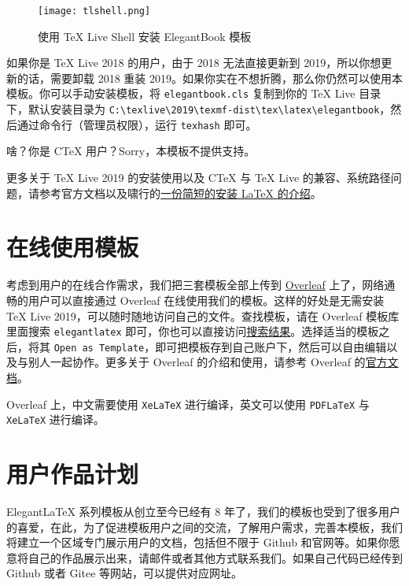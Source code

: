 	\begin{figure}[htbp]
	\centering
	\texttt{[image: tlshell.png]}
	\caption{使用 \TeX{} Live Shell 安装 ElegantBook 模板}
	\end{figure}
	
	如果你是 \TeX{} Live 2018 的用户，由于 2018 无法直接更新到 2019，所以你想更新的话，需要卸载 2018 重装 2019。如果你实在不想折腾，那么你仍然可以使用本模板。你可以手动安装模板，将 \lstinline{elegantbook.cls} 复制到你的 \TeX{} Live 目录下，默认安装目录为 \lstinline|C:\texlive\2019\texmf-dist\tex\latex\elegantbook|，然后通过命令行（管理员权限），运行 \lstinline{texhash} 即可。
	
	啥？你是 C\TeX{} 用户？Sorry，本模板不提供支持。
	
	更多关于 \TeX{} Live 2019 的安装使用以及 C\TeX{} 与 \TeX{} Live 的兼容、系统路径问题，请参考官方文档以及啸行的\href{https://github.com/OsbertWang/install_latex/releases}{一份简短的安装 \LaTeX{} 的介绍}。
	
	\section{在线使用模板}
	考虑到用户的在线合作需求，我们把三套模板全部上传到 \href{https://www.overleaf.com/}{Overleaf} 上了，网络通畅的用户可以直接通过 Overleaf 在线使用我们的模板。这样的好处是无需安装 \TeX{} Live 2019，可以随时随地访问自己的文件。查找模板，请在 Overleaf 模板库里面搜索 \lstinline{elegantlatex} 即可，你也可以直接访问\href{https://www.overleaf.com/latex/templates?addsearch=elegantlatex}{搜索结果}。选择适当的模板之后，将其 \lstinline{Open as Template}，即可把模板存到自己账户下，然后可以自由编辑以及与别人一起协作。更多关于 Overleaf 的介绍和使用，请参考 Overleaf 的\href{https://www.overleaf.com/learn}{官方文档}。
	
	\begin{remark}
	Overleaf 上，中文需要使用 \lstinline{XeLaTeX} 进行编译，英文可以使用 \lstinline{PDFLaTeX} 与 \lstinline{XeLaTeX} 进行编译。
	\end{remark}
	
	\section{用户作品计划}
	Elegant\LaTeX{} 系列模板从创立至今已经有 8 年了，我们的模板也受到了很多用户的喜爱，在此，为了促进模板用户之间的交流，了解用户需求，完善本模板，我们将建立一个区域专门展示用户的文档，包括但不限于 Github 和官网等。如果你愿意将自己的作品展示出来，请邮件或者其他方式联系我们。如果自己代码已经传到 Github 或者 Gitee 等网站，可以提供对应网址。
	
